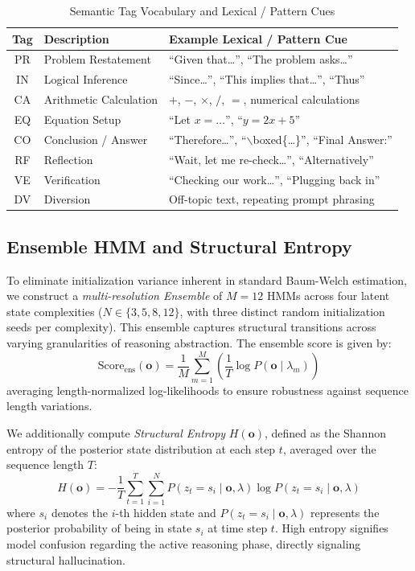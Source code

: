 \documentclass{llncs}
\begin{document}
\begin{table}[t]
\caption{Semantic Tag Vocabulary and Lexical / Pattern Cues}
\label{tab:tags}
\centering
\begin{tabular}{cll}
\toprule
\textbf{Tag} & \textbf{Description} & \textbf{Example Lexical / Pattern Cue}\\
\midrule
PR & Problem Restatement & ``Given that\dots'', ``The problem asks\dots''\\
IN & Logical Inference   & ``Since\dots'', ``This implies that\dots'', ``Thus''\\
CA & Arithmetic Calculation & $+$, $-$, $\times$, $/$, $=$, numerical calculations\\
EQ & Equation Setup      & ``Let $x = \dots$'', ``$y = 2x + 5$''\\
CO & Conclusion / Answer & ``Therefore\dots'', ``$\backslash$boxed\{\dots\}'', ``Final Answer:''\\
RF & Reflection          & ``Wait, let me re-check\dots'', ``Alternatively''\\
VE & Verification        & ``Checking our work\dots'', ``Plugging back in''\\
DV & Diversion           & Off-topic text, repeating prompt phrasing\\
\bottomrule
\end{tabular}
\end{table}

\subsection{Ensemble HMM and Structural Entropy}

To eliminate initialization variance inherent in standard Baum-Welch estimation, we construct a \textit{multi-resolution Ensemble} of $M=12$ HMMs across four latent state complexities ($N \in \{3, 5, 8, 12\}$, with three distinct random initialization seeds per complexity). This ensemble captures structural transitions across varying granularities of reasoning abstraction. The ensemble score is given by:
\begin{equation}
\text{Score}_{\text{ens}}(\mathbf{o}) = \frac{1}{M} \sum_{m=1}^{M} \left( \frac{1}{T} \log P(\mathbf{o} \mid \lambda_m) \right)
\label{eq:ensemble_score}
\end{equation}
averaging length-normalized log-likelihoods to ensure robustness against sequence length variations.

We additionally compute \textit{Structural Entropy} $H(\mathbf{o})$, defined as the Shannon entropy of the posterior state distribution at each step $t$, averaged over the sequence length $T$:
\begin{equation}
H(\mathbf{o}) = -\frac{1}{T} \sum_{t=1}^{T} \sum_{i=1}^{N} P(z_t = s_i \mid \mathbf{o}, \lambda) \log P(z_t = s_i \mid \mathbf{o}, \lambda)
\label{eq:structural_entropy}
\end{equation}
where $s_i$ denotes the $i$-th hidden state and $P(z_t = s_i \mid \mathbf{o}, \lambda)$ represents the posterior probability of being in state $s_i$ at time step $t$. High entropy signifies model confusion regarding the active reasoning phase, directly signaling structural hallucination.
\end{document}
